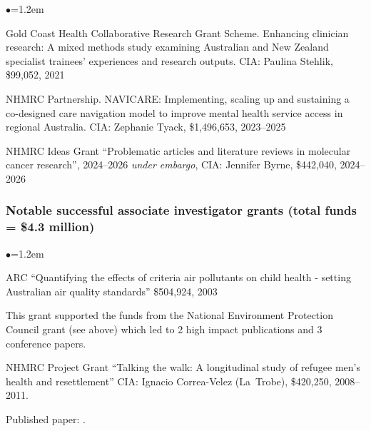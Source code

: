 \documentclass[a4paper,11pt]{article}
\renewcommand{\labelitemi}{$\bullet$}
\begin{document}
\begin{raggedright}
\begin{list}{\labelitemi}{\leftmargin=1.2em}
\item Gold Coast Health Collaborative Research Grant Scheme. Enhancing clinician research: A mixed methods study examining Australian and New Zealand specialist trainees' experiences and research outputs. CIA: Paulina Stehlik, \$99,052, 2021 

\item NHMRC Partnership. NAVICARE: Implementing, scaling up and sustaining a co-designed care navigation model to improve mental health service access in regional Australia. CIA: Zephanie Tyack, \$1,496,653, 2023--2025

\item NHMRC Ideas Grant ``Problematic articles and literature reviews in molecular cancer research'', 2024--2026 \textit{under embargo}, CIA: Jennifer Byrne, \$442,040, 2024--2026

\end{list}


\subsubsection*{Notable successful associate investigator grants (total funds = \$4.3 million)} %

\begin{list}{\labelitemi}{\leftmargin=1.2em}\addtolength{\itemsep}{-0.5\baselineskip}

\item ARC ``Quantifying the effects of criteria air pollutants on child health - setting Australian air quality standards'' \$504,924, 2003

    This grant supported the funds from the National Environment Protection Council grant (see above) which led to 2 high impact publications  and 3 conference papers. %

\item NHMRC Project Grant ``Talking the walk: A longitudinal study of refugee men's health and resettlement'' CIA: Ignacio Correa-Velez (La~Trobe), \$420,250, 2008--2011. 

    Published paper: .



\end{list}
\end{raggedright}
\end{document}
